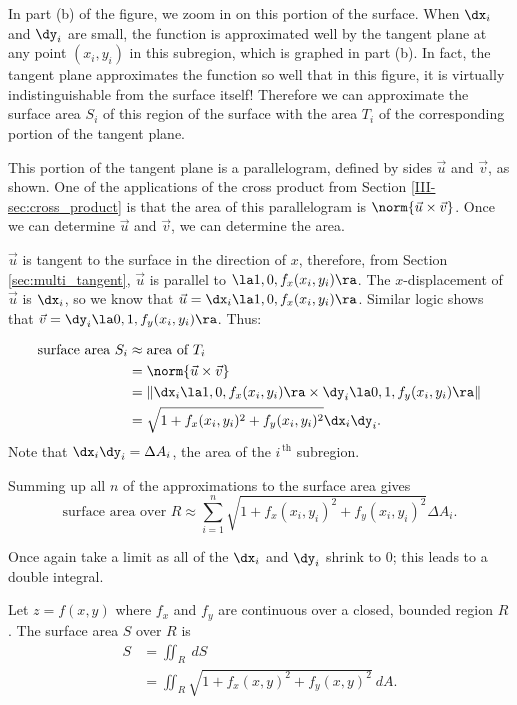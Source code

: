 In part (b) of the figure, we zoom in on this portion of the surface. When $\dx_i$ and $\dy_i$ are small, the function is approximated well by the tangent plane at any point $(x_i,y_i)$ in this subregion, which is graphed in part (b). In fact, the tangent plane approximates the function so well that in this figure, it is virtually indistinguishable from the surface itself! Therefore we can approximate the surface area $S_i$ of this region of the surface with the area $T_i$ of the corresponding portion of the tangent plane.

This portion of the tangent plane is a parallelogram, defined by sides $\vec u$ and $\vec v$, as shown. One of the applications of the cross product from Section \ref{III-sec:cross_product} is that the area of this parallelogram is $\norm{\vec u\times \vec v}$. Once we can determine $\vec u$ and $\vec v$, we can determine the area.

$\vec u$ is tangent to the surface in the direction of $x$, therefore, from Section \ref{sec:multi_tangent}, $\vec u$ is parallel to $\la 1,0,f_x(x_i,y_i)\ra$. The $x$-displacement of $\vec u$ is $\dx_i$, so we know that $\vec u = \dx_i\la 1,0,f_x(x_i,y_i)\ra$. Similar logic shows that $\vec v = \dy_i\la 0,1,f_y(x_i,y_i)\ra$. Thus:

\begin{align*}
\text{surface area $S_i$} &\approx \text{area of  $T_i$}\\
				&= \norm{\vec u\times \vec v}\\
				&= \left\lVert\dx_i\la 1,0,f_x(x_i,y_i)\ra\times\dy_i\la 0,1,f_y(x_i,y_i)\ra\right\rVert\\
				&=\sqrt{1+f_x(x_i,y_i)^2+f_y(x_i,y_i)^2}\dx_i\dy_i.
\end{align*}
Note that $\dx_i\dy_i = \Delta A_i$, the area of the $i^{\,\text{th}}$ subregion.

Summing up all $n$ of the approximations to the surface area gives
\[
\text{surface area over $R$} \approx \sum_{i=1}^n \sqrt{1+f_x(x_i,y_i)^2+f_y(x_i,y_i)^2}\Delta A_i.
\]

Once again take a limit as all of the $\dx_i$ and $\dy_i$ shrink to 0; this leads to a double integral.

{Let $z=f(x,y)$ where $f_x$ and $f_y$ are continuous over a closed, bounded region $R$. The surface area $S$ over $R$ is 
\begin{align*}
S &= \iint_R \ dS\\
&=\iint_R \sqrt{1+f_x(x,y)^2+f_y(x,y)^2}\ dA.
\end{align*}
}

